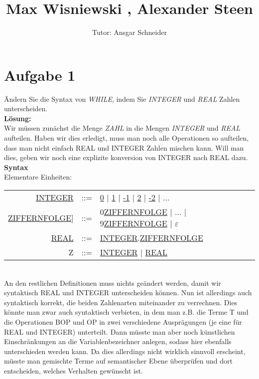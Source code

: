 \documentclass[11pt,a4paper,ngerman]{article}
\author{Tutor: Ansgar Schneider}
\date{}
\title{Max Wisniewski , Alexander Steen}
\begin{document}

\maketitle
\thispagestyle{fancy}



\section*{Aufgabe 1}

Ändern Sie die Syntax von \emph{WHILE}, indem Sie \emph{INTEGER} und \emph{REAL} Zahlen unterscheiden.\\

\textbf{Lösung:}\\
Wir müssen zunächst die Menge \emph{ZAHL} in die Mengen \emph{INTEGER} und \emph{REAL} aufteilen. Haben wir dies erledigt, muss man noch alle Operationen so aufteilen, dass man nicht einfach REAL und INTEGER Zahlen mischen kann. Will man dies, geben wir noch eine explizite konversion von INTEGER nach REAL dazu.\\

\textbf{Syntax}\\
Elementare Einheiten:\\
\begin{tabular}{rcl}
	\underline{INTEGER} &::=& \underline{0} | \underline{1}
		| 	\underline{-1} | \underline{2} | \underline{-2} | ... \\
	\underline{ZIFFERNFOLGE}] &::=&  0\underline{ZIFFERNFOLGE}
		| ... | 9\underline{ZIFFERNFOLGE} | $\varepsilon$ \\
	\underline{REAL} &::=& 
		\underline{INTEGER}.\underline{ZIFFERNFOLGE}\\
	Z &::=& \underline{INTEGER} | \underline{REAL}
\end{tabular}\\
An den restlichen Definitionen muss nichts geändert werden, damit wir syntaktisch \mbox{REAL} und INTEGER unterscheiden können. Nun ist allerdings auch syntaktisch korrekt, die beiden Zahlenarten miteinander zu verrechnen. Dies könnte man zwar auch syntaktisch verbieten, in dem man z.B. die Terme T und die Operationen BOP und OP in zwei verschiedene Ausprägungen (je eine für REAL und INTEGER) unterteilt. Dann müsste man aber noch künstlichen Einschränkungen an die Variablenbezeichner anlegen, sodass hier ebenfalls unterschieden werden kann. Da dies allerdings nicht wirklich sinnvoll erscheint, müsste man gemischte Terme auf semantischer Ebene überprüfen und dort entscheiden, welches Verhalten gewünscht ist.
\end{document}
